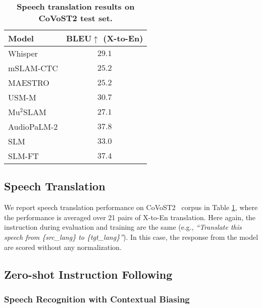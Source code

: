 \begin{table}
  \label{table:top-level-results}
  \centering
  \begin{tabular}{lc}
    \toprule
    \multirow{1}{*}{Model}     & BLEU$\uparrow$ (X-to-En)  \\
    \midrule
    \midrule
    Whisper \cite{radford2023robust} & $29.1$    \\
    mSLAM-CTC \cite{bapna2022mslam} & $25.2$    \\
    MAESTRO \cite{chen2022maestro} & $25.2$     \\
    USM-M \cite{zhang2023google} & $30.7$ \\
    Mu$^{2}$SLAM \cite{cheng2023mu} & $27.1$  \\
    AudioPaLM-2 \cite{rubenstein2023audiopalm} & $37.8$   \\
    \midrule
    SLM & $33.0$ \\
    SLM-FT & $37.4$ \\
    \bottomrule
  \end{tabular}
    \caption{\textbf{Speech translation results on CoVoST2 test set.}}
    \label{tab:ast_results}
        \vspace*{-.15in}
\end{table}

\subsection{Speech Translation}
\label{sec:ast_results}

We report speech translation performance on CoVoST2~\cite{wang2020covost} corpus in Table \ref{tab:ast_results}, where the performance is averaged over 21 pairs of X-to-En translation. Here again, the instruction during evaluation and training are the same (e.g., {\em ``Translate this speech from \{src\_lang\} to \{tgt\_lang\}''}). In this case, the response from the model are scored without any normalization.

\subsection{Zero-shot Instruction Following}
\label{sec:instruction}

\subsubsection{Speech Recognition with Contextual Biasing}
\label{sec:biasing_results}
 
